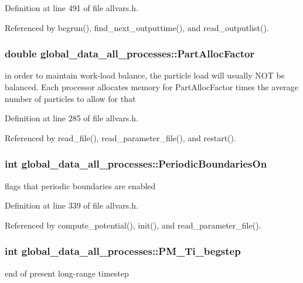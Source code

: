 Definition at line 491 of file allvars.h.



Referenced by begrun(), find\_\-next\_\-outputtime(), and read\_\-outputlist().

\hypertarget{structglobal__data__all__processes_aa9ceb5cacadcf2cadfc7154ab8d7fc88}{
\subsubsection[{PartAllocFactor}]{\setlength{\rightskip}{0pt plus 5cm}double {\bf global\_\-data\_\-all\_\-processes::PartAllocFactor}}}
\label{structglobal__data__all__processes_aa9ceb5cacadcf2cadfc7154ab8d7fc88}
in order to maintain work-\/load balance, the particle load will usually NOT be balanced. Each processor allocates memory for PartAllocFactor times the average number of particles to allow for that 

Definition at line 285 of file allvars.h.



Referenced by read\_\-file(), read\_\-parameter\_\-file(), and restart().

\hypertarget{structglobal__data__all__processes_a52b027433ffad064869c606656e9bf7d}{
\subsubsection[{PeriodicBoundariesOn}]{\setlength{\rightskip}{0pt plus 5cm}int {\bf global\_\-data\_\-all\_\-processes::PeriodicBoundariesOn}}}
\label{structglobal__data__all__processes_a52b027433ffad064869c606656e9bf7d}
flags that periodic boundaries are enabled 

Definition at line 339 of file allvars.h.



Referenced by compute\_\-potential(), init(), and read\_\-parameter\_\-file().

\hypertarget{structglobal__data__all__processes_a53412b692a49924318748259987031aa}{
\subsubsection[{PM\_\-Ti\_\-begstep}]{\setlength{\rightskip}{0pt plus 5cm}int {\bf global\_\-data\_\-all\_\-processes::PM\_\-Ti\_\-begstep}}}
\label{structglobal__data__all__processes_a53412b692a49924318748259987031aa}
end of present long-\/range timestep 

